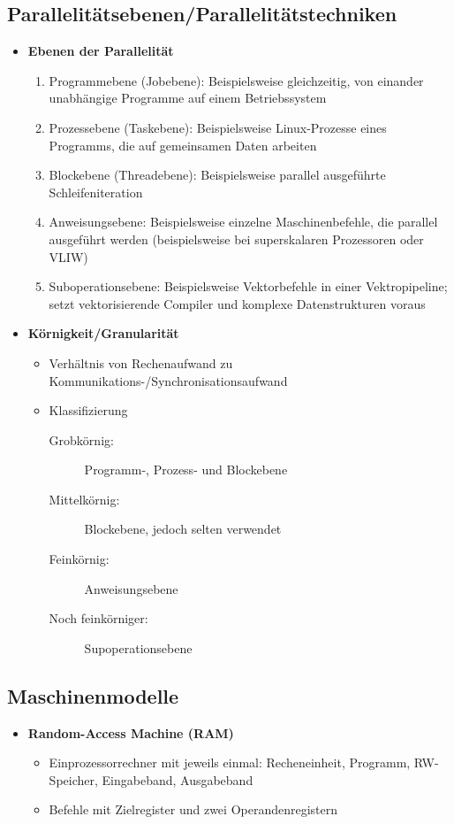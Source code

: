 \subsection{Parallelitätsebenen/Parallelitätstechniken}
\begin{itemize}
	\item \textbf{Ebenen der Parallelität}
	\begin{enumerate}
		\item Programmebene (Jobebene): Beispielsweise gleichzeitig, von einander unabhängige Programme auf einem Betriebssystem
		\item Prozessebene (Taskebene): Beispielsweise Linux-Prozesse eines Programms, die auf gemeinsamen Daten arbeiten
		\item Blockebene (Threadebene): Beispielsweise parallel ausgeführte Schleifeniteration
		\item Anweisungsebene: Beispielsweise einzelne Maschinenbefehle, die parallel ausgeführt werden (beispielsweise bei superskalaren Prozessoren oder VLIW) 
		\item Suboperationsebene: Beispielsweise Vektorbefehle in einer Vektropipeline; setzt vektorisierende Compiler und komplexe Datenstrukturen voraus
	\end{enumerate}
	\item \textbf{Körnigkeit/Granularität}
	\begin{itemize}
		\item Verhältnis von Rechenaufwand zu Kommunikations-/Synchronisationsaufwand
		\item Klassifizierung
		\begin{description}
			\item[Grobkörnig:] Programm-, Prozess- und Blockebene
			\item[Mittelkörnig:] Blockebene, jedoch selten verwendet
			\item[Feinkörnig:] Anweisungsebene
			\item[Noch feinkörniger:] Supoperationsebene
		\end{description}
	\end{itemize}
\end{itemize}


\subsection{Maschinenmodelle}
\begin{itemize}
	\item \textbf{Random-Access Machine (RAM)}
	\begin{itemize}
		\item Einprozessorrechner mit jeweils einmal: Recheneinheit, Programm, RW-Speicher, Eingabeband, Ausgabeband
		\item Befehle mit Zielregister und zwei Operandenregistern
	\end{itemize}
\end{itemize}

